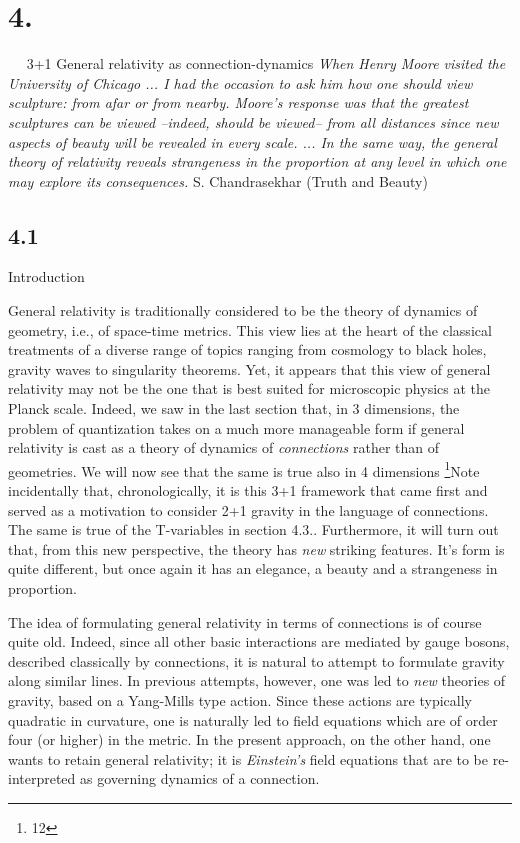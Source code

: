 \goodbreak
\vfill\break

%
\def\E{$\tw E^a{}_i$}  \def\e{$e^a{}_I$}
\def\A{$A_a{}^i$}      \def \fA{${}^4\!A_a{}^{IJ}$}
%
\section{4.}{${}\quad$ 3+1 General relativity as connection-dynamics}
\medskip
{\narrower\narrower\smallskip\noindent
{\sl When Henry Moore visited the University of Chicago ... I had
the occasion to ask him how one should view sculpture: from
afar or from nearby. Moore's response was that the greatest
sculptures can be viewed --indeed, should be viewed-- from all
distances since new aspects of beauty will be revealed in every
scale. ... In the same way, the general theory of relativity
reveals strangeness in the proportion at any level in which
one may explore its consequences.}
\smallskip
S. Chandrasekhar (Truth and Beauty)\smallskip}

\subsection{4.1}{Introduction}

General relativity is traditionally considered to be the theory of  dynamics
of geometry, i.e., of space-time metrics. This view lies at the heart of the
classical treatments of a diverse range of topics ranging from cosmology to
black holes, gravity waves to singularity theorems. Yet, it appears that this
view of general relativity may not be the one that is best suited for
microscopic physics at the Planck scale. Indeed, we saw in the last section
that, in 3 dimensions, the problem of quantization takes on a much more
manageable form if general relativity is cast as a theory of dynamics of
{\it connections} rather than of geometries. We will now see that the same
is true also in 4 dimensions%
\footnote{12}{Note incidentally that, chronologically, it is this 3+1 framework
that came first and served as a motivation to consider 2+1 gravity in the
language of connections. The same is true of the T-variables in section 4.3.}.
Furthermore, it will turn out that, from this new perspective, the theory
has {\it new} striking features. It's form is quite different, but once again
it has an elegance, a beauty and a strangeness in proportion.

The idea of formulating general relativity in terms of connections is
of course quite old. Indeed, since all other basic interactions are
mediated by gauge bosons, described classically by connections, it is
natural to attempt to formulate gravity along similar lines.
In previous attempts, however, one was led to {\it new} theories of
gravity, based on a Yang-Mills type action. Since these actions are
typically quadratic in curvature, one is naturally led to field equations
which are of order four (or higher) in the metric. In the present approach,
on the other hand, one wants to retain general relativity; it is {\it
Einstein's} field equations that are to be re-interpreted as governing
dynamics of a connection.

